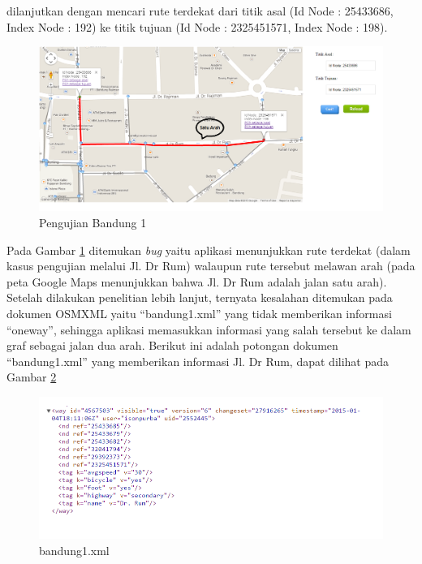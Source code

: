 dilanjutkan dengan mencari rute terdekat dari titik asal (Id Node : 25433686,
Index Node : 192) ke titik tujuan (Id Node : 2325451571, Index Node : 198).
\begin{figure}[h]
\centering
\includegraphics[scale=0.45]{Gambar/pu_bandung1_rute}
\caption[Pengujian Bandung 1]{Pengujian Bandung 1}
\label{fig:pu_bandung1_rute}
\end{figure}
Pada Gambar \ref{fig:pu_bandung1_rute} ditemukan \textit{bug} yaitu aplikasi
menunjukkan rute terdekat (dalam kasus pengujian melalui Jl. Dr Rum) walaupun
rute tersebut melawan arah (pada peta Google Maps menunjukkan bahwa Jl. Dr Rum
adalah jalan satu arah). Setelah dilakukan penelitian lebih lanjut, ternyata kesalahan
ditemukan pada dokumen OSMXML yaitu ``bandung1.xml'' yang tidak memberikan
informasi ``oneway'', sehingga aplikasi memasukkan informasi yang salah tersebut
ke dalam graf sebagai jalan dua arah. Berikut ini adalah potongan dokumen
``bandung1.xml'' yang memberikan informasi Jl. Dr Rum, dapat dilihat pada Gambar
\ref{fig:bandung1_xml} 
\begin{figure}[h]
\centering
\includegraphics[scale=0.7]{Gambar/bandung1_xml}
\caption[bandung1.xml]{bandung1.xml}
\label{fig:bandung1_xml}
\end{figure}

